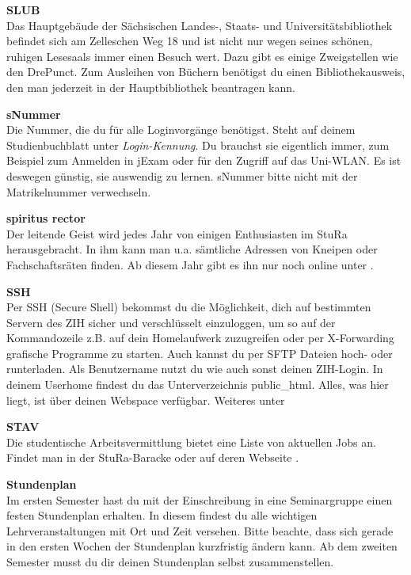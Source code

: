 \begin{multicols}{2}
\textbf{SLUB} \\
Das Hauptgebäude der Sächsischen Landes-, Staats- und Universitätsbibliothek befindet sich am Zelleschen Weg 18 und ist nicht nur wegen seines schönen, ruhigen Lesesaals immer einen Besuch wert.
Dazu gibt es einige Zweigstellen wie den DrePunct.
Zum Ausleihen von Büchern benötigst du einen Bibliothekausweis, den man jederzeit in der Hauptbibliothek beantragen kann. 

\textbf{sNummer} \\
Die Nummer, die du für alle Loginvorgänge benötigst.
Steht auf deinem Studienbuchblatt unter \textit{Login-Kennung}.
Du brauchst sie eigentlich immer, zum Beispiel zum Anmelden in jExam oder für den Zugriff auf das Uni-WLAN.
Es ist deswegen günstig, sie auswendig zu lernen.
sNummer bitte nicht mit der Matrikelnummer verwechseln.

\vfill\columnbreak

\textbf{spiritus rector} \\
Der \glqq leitende Geist\grqq{} wird jedes Jahr von einigen Enthusiasten im StuRa herausgebracht.
In ihm kann man u.a. sämtliche Adressen von Kneipen oder Fachschaftsräten finden. Ab diesem Jahr gibt es ihn nur noch online unter .

\textbf{SSH} \\
Per SSH (Secure Shell) bekommst du die Möglichkeit, dich auf bestimmten Servern des ZIH sicher und verschlüsselt einzuloggen, um so auf der Kommandozeile z.B. auf dein Homelaufwerk zuzugreifen oder per X-Forwarding grafische Programme zu starten.
Auch kannst du per SFTP Dateien hoch- oder runterladen.
Als Benutzername nutzt du wie auch sonst deinen ZIH-Login.
In deinem Userhome findest du das Unterverzeichnis public\_html.
Alles, was hier liegt, ist über deinen Webspace verfügbar. 
Weiteres unter 

\textbf{STAV} \\
Die studentische Arbeitsvermittlung bietet eine Liste von aktuellen Jobs an.
Findet man in der StuRa-Baracke oder auf deren Webseite .

\textbf{Stundenplan} \\
Im ersten Semester hast du mit der Einschreibung in eine Seminargruppe einen festen Stundenplan erhalten. In diesem findest du alle wichtigen Lehrveranstaltungen mit Ort und Zeit versehen. Bitte beachte, dass sich gerade in den ersten Wochen der Stundenplan kurzfristig ändern kann.
Ab dem zweiten Semester musst du dir deinen Stundenplan selbst zusammenstellen.


\end{multicols}
